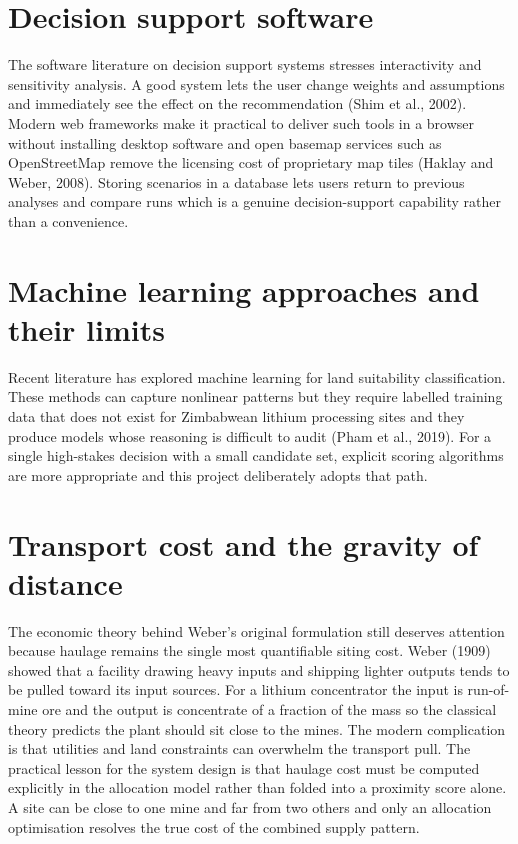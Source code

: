 \documentclass[12pt,a4paper]{report}
\begin{document}
\section{Decision support software}
The software literature on decision support systems stresses
interactivity and sensitivity analysis. A good system lets the user
change weights and assumptions and immediately see the effect on the
recommendation (Shim et al., 2002). Modern web frameworks make it
practical to deliver such tools in a browser without installing
desktop software and open basemap services such as OpenStreetMap
remove the licensing cost of proprietary map tiles (Haklay and Weber,
2008). Storing scenarios in a database lets users return to previous
analyses and compare runs which is a genuine decision-support
capability rather than a convenience.

\section{Machine learning approaches and their limits}
Recent literature has explored machine learning for land suitability
classification. These methods can capture nonlinear patterns but they
require labelled training data that does not exist for Zimbabwean
lithium processing sites and they produce models whose reasoning is
difficult to audit (Pham et al., 2019). For a single high-stakes
decision with a small candidate set, explicit scoring algorithms are
more appropriate and this project deliberately adopts that path.

\section{Transport cost and the gravity of distance}
The economic theory behind Weber's original formulation still deserves
attention because haulage remains the single most quantifiable siting
cost. Weber (1909) showed that a facility drawing heavy inputs and
shipping lighter outputs tends to be pulled toward its input sources.
For a lithium concentrator the input is run-of-mine ore and the
output is concentrate of a fraction of the mass so the classical
theory predicts the plant should sit close to the mines. The modern
complication is that utilities and land constraints can overwhelm the
transport pull. The practical lesson for the system design is that
haulage cost must be computed explicitly in the allocation model
rather than folded into a proximity score alone. A site can be close
to one mine and far from two others and only an allocation
optimisation resolves the true cost of the combined supply pattern.
\end{document}
